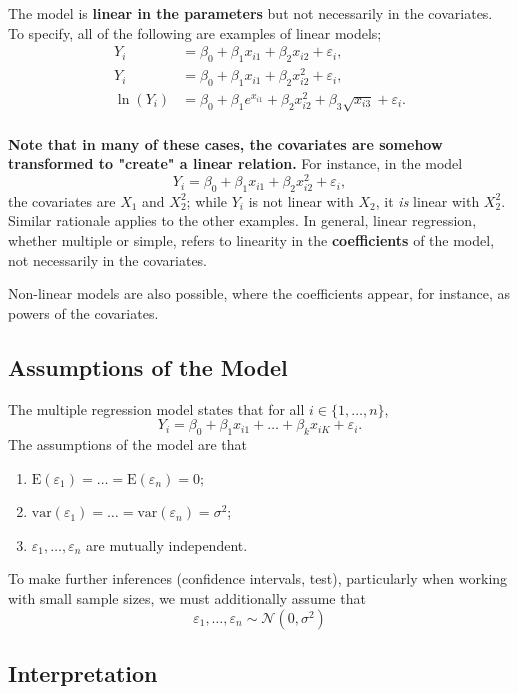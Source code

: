 \documentclass[12pt]{article}
\begin{document}
The model is \textbf{linear in the parameters} but not necessarily in the covariates. To specify, all of the following are examples of linear models; \begin{align*}
    Y_i &= \beta_0 + \beta_1 x_{i1} + \beta_2 x_{i2} + \varepsilon_i,\\
    Y_i &= \beta_0 + \beta_1 x_{i1} + \beta_2 x_{i2}^2 + \varepsilon_i,\\
    \ln(Y_i) &= \beta_0 + \beta_1 e^{x_{i1}} + \beta_2 x_{i2}^2 + \beta_3 \sqrt{x_{i3}} + \varepsilon_i.\\
\end{align*}

\textbf{Note that in many of these cases, the covariates are somehow transformed to "create" a linear relation.} For instance, in the model \[Y_i = \beta_0 + \beta_1 x_{i1} + \beta_2 x_{i2}^2 + \varepsilon_i,\] the covariates are $X_1$ and $X_2^2$; while $Y_i$ is not linear with $X_2$, it \textit{is} linear with $X_2^2$. Similar rationale applies to the other examples. In general, linear regression, whether multiple or simple, refers to linearity in the \textbf{coefficients} of the model, not necessarily in the covariates.

Non-linear models are also possible, where the coefficients appear, for instance, as powers of the covariates.

\subsection{Assumptions of the Model}

The multiple regression model states that for all $i \in \{1,\dots,n\}$, \[Y_i = \beta_0 + \beta_1 x_{i1} + \dots + \beta_k x_{iK} + \varepsilon_i.\] The assumptions of the model are that \begin{enumerate}
    \item $\text{E}(\varepsilon_1) = \dots = \text{E}(\varepsilon_n) = 0$;
    \item $\text{var}(\varepsilon_1) = \dots = \text{var}(\varepsilon_n) = \sigma^2$;
    \item $\varepsilon_1, \dots, \varepsilon_n$ are mutually independent.
\end{enumerate}

To make further inferences (confidence intervals, test), particularly when working with small sample sizes, we must additionally assume that \[\varepsilon_1, \dots, \varepsilon_n \sim \mathcal{N}(0, \sigma^2)\]

\subsection{Interpretation}
\end{document}
